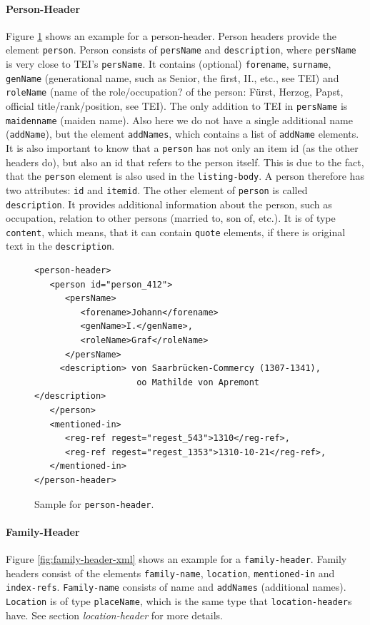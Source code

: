 \paragraph{Person-Header}
Figure \ref{fig:person-header-xml} shows an example for a person-header. Person headers provide the element \texttt{person}. Person consists of \texttt{persName} and \texttt{description}, where \texttt{persName} is very close to TEI's \texttt{persName}. It contains (optional) \texttt{forename}, \texttt{surname}, \texttt{genName} (generational name, such as Senior, the first, II., etc., see TEI) and \texttt{roleName} (name of the role/occupation? of the person: Fürst, Herzog, Papst, official title/rank/position, see TEI). The only addition to TEI in \texttt{persName} is \texttt{maidenname} (maiden name). Also here we do not have a single additional name (\texttt{addName}), but the element \texttt{addNames}, which contains a list of \texttt{addName} elements. It is also important to know that a \texttt{person} has not only an item id (as the other headers do), but also an id that refers to the person itself. This is due to the fact, that the \texttt{person} element is also used in the \texttt{listing-body}. A person therefore has two attributes: \texttt{id} and \texttt{itemid}.
The other element of \texttt{person} is called \texttt{description}. It provides additional information about the person, such as occupation, relation to other persons (married to, son of, etc.). It is of type \texttt{content}, which means, that it can contain \texttt{quote} elements, if there is original text in the \texttt{description}.

\begin{figure}[H]
\centering
\begin{verbatim}
<person-header>
   <person id="person_412">
      <persName>
         <forename>Johann</forename> 
         <genName>I.</genName>, 
         <roleName>Graf</roleName>
      </persName>
     <description> von Saarbrücken-Commercy (1307-1341), 
                    oo Mathilde von Apremont    </description>
   </person>
   <mentioned-in>
      <reg-ref regest="regest_543">1310</reg-ref>, 
      <reg-ref regest="regest_1353">1310-10-21</reg-ref>, 
   </mentioned-in>
</person-header>
\end{verbatim}
\label{fig:person-header-xml}
\caption{Sample for \texttt{person-header}.}
\end{figure}

\paragraph{Family-Header}
Figure \ref{fig:family-header-xml} shows an example for a \texttt{family-header}. Family headers consist of the elements \texttt{family-name}, \texttt{location}, \texttt{mentioned-in} and \texttt{index-refs}. \texttt{Family-name} consists of name and \texttt{addNames} (additional names). \texttt{Location} is of type \texttt{placeName}, which is the same type that \texttt{location-header}s have. See section \textit{location-header} for more details.

